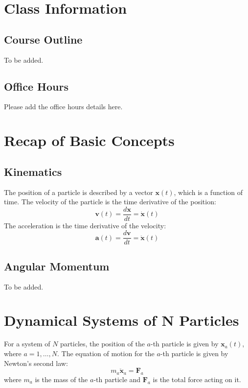 \section*{Class Information}

\subsection*{Course Outline}
To be added.

\subsection*{Office Hours}
Please add the office hours details here.

\section{Recap of Basic Concepts}

\subsection{Kinematics}
The position of a particle is described by a vector $\mathbf{x}(t)$, which is a function of time. The velocity of the particle is the time derivative of the position:
\begin{equation}
    \mathbf{v}(t) = \frac{d\mathbf{x}}{dt} = \dot{\mathbf{x}}(t)
\end{equation}
The acceleration is the time derivative of the velocity:
\begin{equation}
    \mathbf{a}(t) = \frac{d\mathbf{v}}{dt} = \ddot{\mathbf{x}}(t)
\end{equation}

\subsection{Angular Momentum}
To be added.

\section{Dynamical Systems of N Particles}

For a system of $N$ particles, the position of the $a$-th particle is given by $\mathbf{x}_a(t)$, where $a=1, \dots, N$. The equation of motion for the $a$-th particle is given by Newton's second law:
\begin{equation}
    m_a \ddot{\mathbf{x}}_a = \mathbf{F}_a
\end{equation}
where $m_a$ is the mass of the $a$-th particle and $\mathbf{F}_a$ is the total force acting on it.

